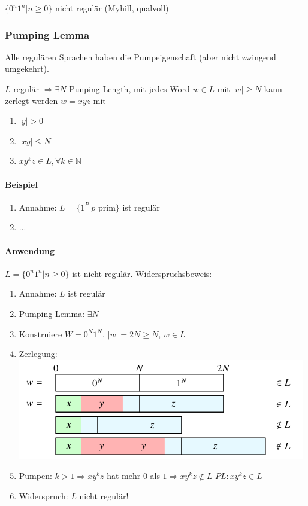 $\{0^n 1^n | n \geq 0\}$ nicht regulär (Myhill, qualvoll)

\subsubsection{Pumping Lemma}

Alle regulären Sprachen haben die Pumpeigenschaft (aber nicht zwingend umgekehrt).

$L$ regulär $\Rightarrow \exists N$ Punping Length, mit jedes Word $w \in L$ mit $|w| \geq N$ kann zerlegt werden $w=xyz$ mit 
\begin{enumerate}
	\item $|y| > 0$
	\item $|xy| \leq N$
	\item $xy^kz \in L, \forall k \in \mathbb{N}$
\end{enumerate}

\paragraph{Beispiel}

\begin{enumerate}
	\item Annahme: $L = \{ 1^P | p \text{ prim}\}$ ist regulär
	\item ...
\end{enumerate}

\paragraph{Anwendung}

$L=\{0^n1^n|n \geq 0 \}$ ist nicht regulär. Widerspruchsbeweis:

\begin{enumerate}
	\item	Annahme: $L$ ist regulär
	\item	Pumping Lemma: $\exists N$
	\item	Konstruiere $W = 0^N1^N$, $|w| = 2N \geq N$, $w \in L$
	\item	Zerlegung: \\
			\includegraphics[scale=0.5]{img/pumpinglemma.png}
	\item	Pumpen: $k > 1 \Rightarrow xy^kz$ hat mehr $0$ als $1 \Rightarrow xy^kz \not\in L$ \Lightning $PL: xy^kz \in L$
	\item	Widerspruch: $L$ nicht regulär!
\end{enumerate}

